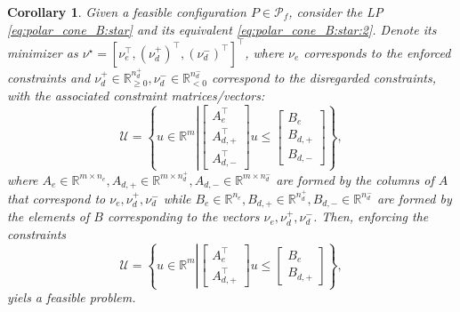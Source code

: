 \documentclass[letterpaper, 10 pt, conference]{ieeeconf}  %
\newtheorem{corollary}{\textbf{Corollary}}
\begin{document}
\begin{corollary}\label{col:adding_cons}
Given a feasible configuration $P\in\mathcal{P}_f$, consider the LP \eqref{eq:polar_cone_B:star} and its equivalent \eqref{eq:polar_cone_B:star:2}. Denote its minimizer as $\nu^\star = \left[ \nu_e ^\top, (\nu_d^+)^\top, (\nu_d^-)^\top \right]^\top$, where $\nu_e$ corresponds to the enforced constraints and $\nu_d^+ \in \mathbb{R}^{n_d^+}_{\geq 0}, \nu_d^- \in \mathbb{R}^{n_d^-}_{< 0}$ correspond to the disregarded constraints, with the associated constraint matrices/vectors:
\begin{equation}
   \mathcal{U} =  \left\{
        u\in\mathbb{R}^m 
        \left|
            \begin{bmatrix}
                A_{e}^\top \\
                A_{d,+}^\top \\
                A_{d,-}^\top
            \end{bmatrix} u 
            \leq 
            \begin{bmatrix}
                B_{e} \\
                B_{d,+} \\
                B_{d,-}
            \end{bmatrix}
        \right.
    \right\},
\end{equation}
where $A_{e} \in \mathbb{R}^{m \times n_e}, A_{d,+} \in \mathbb{R}^{m \times  n_d^+ }, A_{d,-}  \in \mathbb{R}^{m \times n_d^-}$ are formed by the columns of $A$ that correspond to $\nu_e, \nu_d^+, \nu_d^- $ while  $B_{e}  \in \mathbb{R}^{n_e}, B_{d,+}\in \mathbb{R}^{n_d^+}, B_{d,-}\in \mathbb{R}^{n_d^-}$ are formed by the elements of $B$ corresponding to the vectors $\nu_e, \nu_d^+, \nu_d^- $. Then, enforcing the constraints 
\begin{equation}
   \mathcal{U} =  \left\{
        u\in\mathbb{R}^m 
        \left|
            \begin{bmatrix}
                A_{e}^\top \\
                A_{d,+}^\top 
            \end{bmatrix} u 
            \leq 
            \begin{bmatrix}
                B_{e} \\
                B_{d,+} 
            \end{bmatrix}
        \right.
    \right\},
\end{equation}
yiels a feasible problem. 
\end{corollary}
\end{document}

